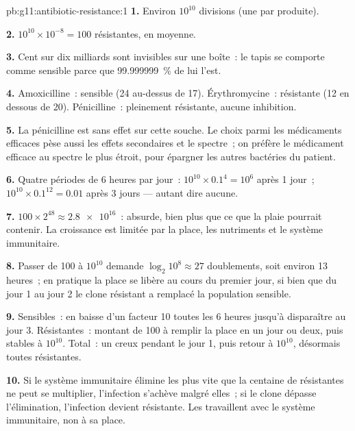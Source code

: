 \begin{solution}{pb:g11:antibiotic-resistance:1}
\textbf{1.} Environ $10^{10}$ divisions (une par  produite).

\textbf{2.} $10^{10} \times 10^{-8} = 100$  résistantes, en moyenne.

\textbf{3.} Cent  sur dix milliards sont invisibles sur une
boîte~: le tapis se comporte comme sensible parce que 99.999999~\% de
lui l'est.

\textbf{4.} Amoxicilline~: sensible (24 au-dessus de 17).
Érythromycine~: résistante (12 en dessous de 20). Pénicilline~:
pleinement résistante, aucune inhibition.

\textbf{5.} La pénicilline est sans effet sur cette souche. Le choix
parmi les médicaments efficaces pèse aussi les effets secondaires et le
spectre~; on préfère le médicament efficace au spectre le plus étroit,
pour épargner les autres bactéries du patient.

\textbf{6.} Quatre périodes de 6 heures par jour~: $10^{10} \times 0.1^4 =
10^6$ après 1 jour~; $10^{10} \times 0.1^{12} = 0.01$ après 3 jours ---
autant dire aucune.

\textbf{7.} $100 \times 2^{48} \approx \num{2.8e16}$~: absurde, bien
plus que ce que la plaie pourrait contenir. La croissance est limitée
par la place, les nutriments et le système immunitaire.

\textbf{8.} Passer de 100  à $10^{10}$ demande
$\log_2 10^8 \approx 27$ doublements, soit environ 13 heures~; en
pratique la place se libère au cours du premier jour, si bien que du
jour 1 au jour 2 le clone résistant a remplacé la population sensible.

\textbf{9.} Sensibles~: en baisse d'un facteur 10 toutes les 6 heures
jusqu'à disparaître au jour 3. Résistantes~: montant de 100 à remplir
la place en un jour ou deux, puis stables à $10^{10}$. Total~: un creux
pendant le jour 1, puis retour à $10^{10}$, désormais toutes
résistantes.

\textbf{10.} Si le système immunitaire élimine les  plus vite
que la centaine de résistantes ne peut se multiplier, l'infection
s'achève malgré elles~; si le clone dépasse l'élimination, l'infection
devient résistante. Les  travaillent avec le système
immunitaire, non à sa place.


\end{solution}
